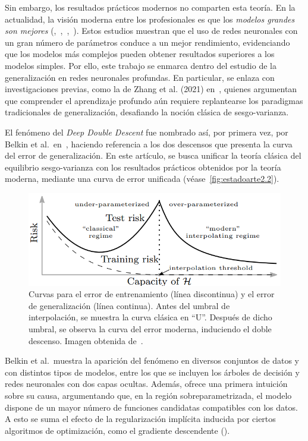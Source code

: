 Sin embargo, los resultados prácticos modernos no comparten esta teoría. En la actualidad, la visión moderna entre los profesionales es que los \emph{modelos grandes son mejores} (\cite{Krizhevsky2012},~\cite{Neal2019},~\cite{Huang2019},~\cite{Szegedy2014}). Estos estudios muestran que el uso de redes neuronales con un gran número de parámetros conduce a un mejor rendimiento, evidenciando que los modelos más complejos pueden obtener resultados superiores a los modelos simples. Por ello, este trabajo se enmarca dentro del estudio de la generalización en redes neuronales profundas. En particular, se enlaza con investigaciones previas, como la de Zhang et al. (2021) en~\cite{Zhang2021}, quienes argumentan que comprender el aprendizaje profundo aún requiere replantearse los paradigmas tradicionales de generalización, desafiando la noción clásica de sesgo-varianza.\newline

El fenómeno del \emph{Deep Double Descent} fue nombrado así, por primera vez, por Belkin et al.\ en~\cite{Belkin2019}, haciendo referencia a los dos descensos que presenta la curva del error de generalización. En este artículo, se busca unificar la teoría clásica del equilibrio sesgo-varianza con los resultados prácticos obtenidos por la teoría moderna, mediante una curva de error unificada (véase~\autoref{fig:estadoarte2.2}).\newline

\begin{figure}[h]
    \centering
    \includegraphics[width=0.8\linewidth]{img/estadoarte2.2.png}
    \caption[Curva del error unificada entre la teoría clásica y moderna.]{Curvas para el error de entrenamiento (línea discontinua) y el error de generalización (línea continua). Antes del umbral de interpolación, se muestra la curva clásica en ``U''. Después de dicho umbral, se observa la curva del error moderna, induciendo el doble descenso. Imagen obtenida de~\cite{Belkin2019}.}\label{fig:estadoarte2.2}
\end{figure}

Belkin et al.\ muestra la aparición del fenómeno en diversos conjuntos de datos y con distintos tipos de modelos, entre los que se incluyen los árboles de decisión y redes neuronales con dos capas ocultas. Además, ofrece una primera intuición sobre su causa, argumentando que, en la región sobreparametrizada, el modelo dispone de un mayor número de funciones candidatas compatibles con los datos. A esto se suma el efecto de la regularización implícita inducida por ciertos algoritmos de optimización, como el gradiente descendente (\cite{Soudry2024}).\newline

